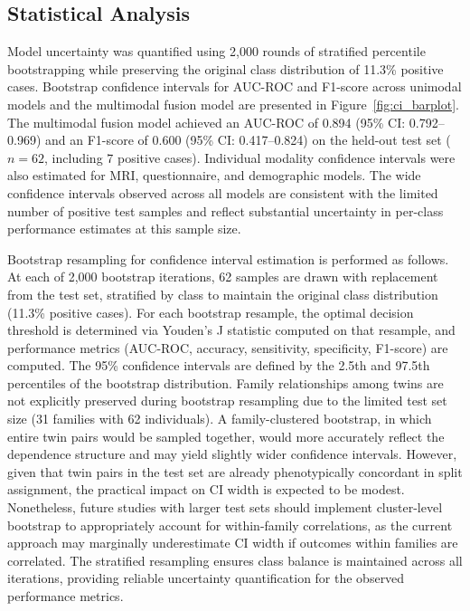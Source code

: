 \documentclass[10pt,letterpaper]{article}
\begin{document}
\subsection*{Statistical Analysis}

Model uncertainty was quantified using 2,000 rounds of stratified percentile bootstrapping while preserving the original class distribution of 11.3\% positive cases. Bootstrap confidence intervals for AUC-ROC and F1-score across unimodal models and the multimodal fusion model are presented in Figure~\ref{fig:ci_barplot}. The multimodal fusion model achieved an AUC-ROC of 0.894 (95\% CI: 0.792--0.969) and an F1-score of 0.600 (95\% CI: 0.417--0.824) on the held-out test set ($n = 62$, including 7 positive cases). Individual modality confidence intervals were also estimated for MRI, questionnaire, and demographic models. The wide confidence intervals observed across all models are consistent with the limited number of positive test samples and reflect substantial uncertainty in per-class performance estimates at this sample size.

Bootstrap resampling for confidence interval estimation is performed as follows. At each of 2,000 bootstrap iterations, 62 samples are drawn with replacement from the test set, stratified by class to maintain the original class distribution (11.3\% positive cases). For each bootstrap resample, the optimal decision threshold is determined via Youden's J statistic computed on that resample, and performance metrics (AUC-ROC, accuracy, sensitivity, specificity, F1-score) are computed. The 95\% confidence intervals are defined by the 2.5th and 97.5th percentiles of the bootstrap distribution. Family relationships among twins are not explicitly preserved during bootstrap resampling due to the limited test set size (31 families with 62 individuals). A family-clustered bootstrap, in which entire twin pairs would be sampled together, would more accurately reflect the dependence structure and may yield slightly wider confidence intervals. However, given that twin pairs in the test set are already phenotypically concordant in split assignment, the practical impact on CI width is expected to be modest. Nonetheless, future studies with larger test sets should implement cluster-level bootstrap to appropriately account for within-family correlations, as the current approach may marginally underestimate CI width if outcomes within families are correlated. The stratified resampling ensures class balance is maintained across all iterations, providing reliable uncertainty quantification for the observed performance metrics.
\end{document}
